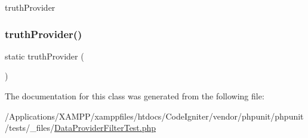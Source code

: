 truth\+Provider \mbox{\label{class_data_provider_filter_test_acffdaf0ac8e420b155372a710c26516b}} 
\subsubsection{\texorpdfstring{truth\+Provider()}{truthProvider()}}
{\footnotesize\ttfamily static truth\+Provider (\begin{DoxyParamCaption}{ }\end{DoxyParamCaption})\hspace{0.3cm}{\ttfamily [static]}}



The documentation for this class was generated from the following file\+:\begin{DoxyCompactItemize}
\item 
/\+Applications/\+X\+A\+M\+P\+P/xamppfiles/htdocs/\+Code\+Igniter/vendor/phpunit/phpunit/tests/\+\_\+files/\mbox{\hyperlink{_data_provider_filter_test_8php}{Data\+Provider\+Filter\+Test.\+php}}\end{DoxyCompactItemize}
